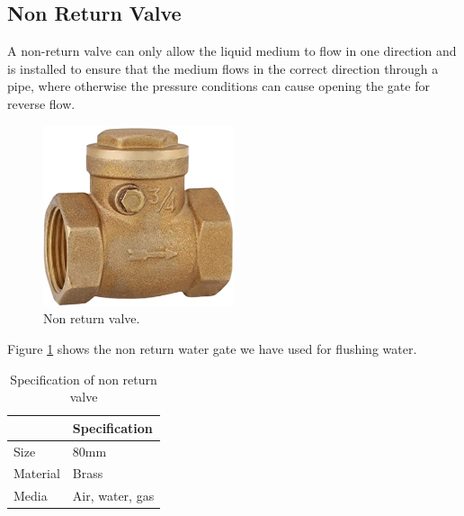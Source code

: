 \subsection{Non Return Valve}
A non-return valve can only allow the liquid medium to flow in one direction and is installed to ensure that the medium flows in the correct direction through a pipe, where otherwise the pressure conditions can cause opening the gate for reverse flow.
\begin{figure}[h]
\centering
\includegraphics[width=0.5\textwidth]{figures/non_return_valve.jpg}
\caption{Non return valve.}
\label{Valve1}
\end{figure}
Figure \ref{Valve1} shows the non return water gate we have used for flushing water.

\begin{table}[H]
\centering
\caption{Specification of non return valve}
\begin{tabular}{|l|l|}
\hline
\multicolumn{1}{|c|}{\cellcolor[HTML]{FFFFFF}{\color[HTML]{333333} \textbf{Characteristics}}} & \textbf{Specification} \\ \hline
Size                                                                                    & 80mm                   \\ \hline
Material                                                                                & Brass                  \\ \hline
Media                                                                                   & Air, water, gas        \\ \hline
\end{tabular}
\end{table}

